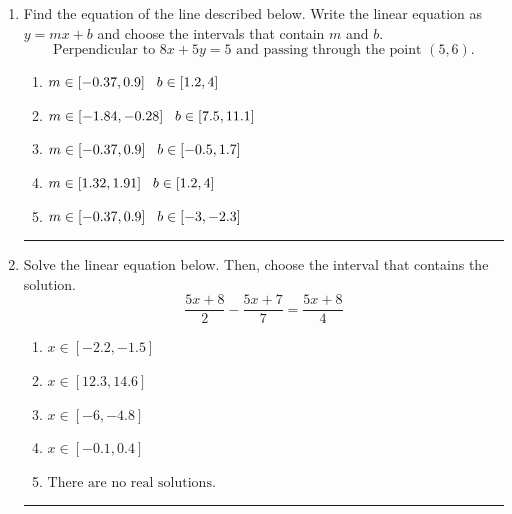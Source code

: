 \documentclass[14pt]{extbook}
\newcommand{\litem}[1]{\item#1\hspace*{-1cm}\rule{\textwidth}{0.4pt}}
\begin{document}
\begin{enumerate}
{\begin{enumerate}[label=\Alph*.]
\end{enumerate} }
\litem{
Find the equation of the line described below. Write the linear equation as $ y=mx+b $ and choose the intervals that contain $m$ and $b$.\[ \text{Perpendicular to } 8 x + 5 y = 5 \text{ and passing through the point } (5, 6). \]\begin{enumerate}[label=\Alph*.]
\item \( m \in [-0.37, 0.9] \hspace*{3mm} b \in [1.2, 4] \)
\item \( m \in [-1.84, -0.28] \hspace*{3mm} b \in [7.5, 11.1] \)
\item \( m \in [-0.37, 0.9] \hspace*{3mm} b \in [-0.5, 1.7] \)
\item \( m \in [1.32, 1.91] \hspace*{3mm} b \in [1.2, 4] \)
\item \( m \in [-0.37, 0.9] \hspace*{3mm} b \in [-3, -2.3] \)

\end{enumerate} }
\litem{
Solve the linear equation below. Then, choose the interval that contains the solution.\[ \frac{5x + 8}{2} - \frac{5x + 7}{7} = \frac{5x + 8}{4} \]\begin{enumerate}[label=\Alph*.]
\item \( x \in [-2.2, -1.5] \)
\item \( x \in [12.3, 14.6] \)
\item \( x \in [-6, -4.8] \)
\item \( x \in [-0.1, 0.4] \)
\item \( \text{There are no real solutions.} \)

\end{enumerate} }
\end{enumerate}
\end{document}
